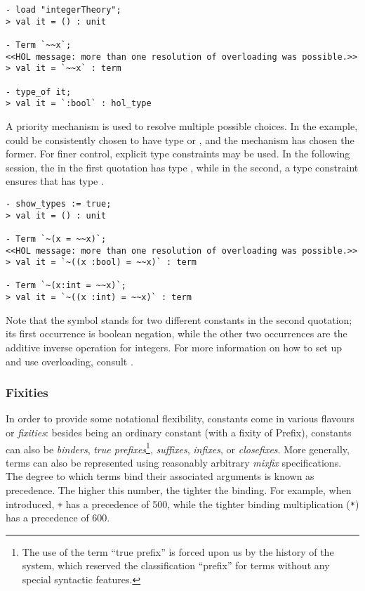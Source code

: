 {\setcounter{sessioncount}{1}
\begin{session}
\begin{hol}
\begin{verbatim}
- load "integerTheory";
> val it = () : unit

- Term `~~x`;
<<HOL message: more than one resolution of overloading was possible.>>
> val it = `~~x` : term

- type_of it;
> val it = `:bool` : hol_type
\end{verbatim}
\end{hol}
\end{session}

A priority mechanism is used to resolve multiple possible choices. In
the example, \holtxt{\~{}} could be consistently chosen to have type
 or , and the
mechanism has chosen the former. For finer control, explicit type
constraints may be used. In the following session, the
 in the first quotation has type ,
while in the second, a type constraint ensures that  has
type .

\begin{session}
\begin{hol}
\begin{verbatim}
- show_types := true;
> val it = () : unit

- Term `~(x = ~~x)`;
<<HOL message: more than one resolution of overloading was possible.>>
> val it = `~((x :bool) = ~~x)` : term

- Term `~(x:int = ~~x)`;
> val it = `~((x :int) = ~~x)` : term
\end{verbatim}
\end{hol}
\end{session}

Note that the symbol \holtxt{\~{}} stands for two different constants in
the second quotation; its first occurrence is boolean negation, while
the other two occurrences are the additive inverse operation for integers.
For more information on how to set up and use overloading, consult
\REFERENCE.

\subsubsection{Fixities}

In order to provide some notational flexibility, constants come in
various flavours or {\it fixities}: besides being an ordinary constant
(with a fixity of {\sf Prefix}), constants can also be {\it binders},
{\it true prefixes}\footnote{The use of the term ``true prefix'' is
forced upon us by the history of the system, which reserved the
classification ``prefix'' for terms without any special syntactic
features.}, {\it suffixes}, {\it infixes}, or {\it closefixes}.  More
generally, terms can also be represented using reasonably arbitrary
{\it mixfix} specifications.  The degree to which terms bind their
associated arguments is known as precedence.  The higher this number,
the tighter the binding.  For example, when introduced, \verb-+- has a
precedence of 500, while the tighter binding multiplication (\verb+*+)
has a precedence of 600.

}

